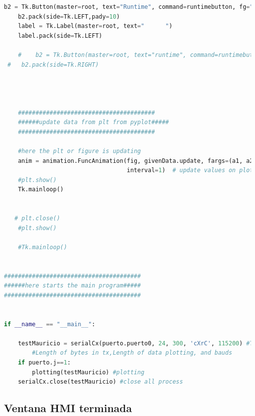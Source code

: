 {\begin{lstlisting}[language=python]
    b2 = Tk.Button(master=root, text="Runtime", command=runtimebutton, fg="blue")
    b2.pack(side=Tk.LEFT,pady=10)
    label = Tk.Label(master=root, text="      ")
    label.pack(side=Tk.LEFT)

    #    b2 = Tk.Button(master=root, text="runtime", command=runtimebutton)
 #   b2.pack(side=Tk.RIGHT)




    #######################################
    ######update data from plt from pyplot#####
    #######################################

    #here the plt or figure is updating
    anim = animation.FuncAnimation(fig, givenData.update, fargs=(a1, a2, a3, a4, rtime), frames=1000,
                                   interval=1)  # update values on plot #200 frames each 1 ms
    #plt.show()
    Tk.mainloop()


   # plt.close()
    #plt.show()

    #Tk.mainloop()


#######################################
######here starts the main program#####
#######################################


if __name__ == "__main__":

    testMauricio = serialCx(puerto.puerto0, 24, 300, 'cXrC', 115200) #This values modifie serialport, 
		#Length of bytes in tx,Length of data plotting, and bauds
    if puerto.j==1:
        plotting(testMauricio) #plotting
    serialCx.close(testMauricio) #close all process


\end{lstlisting}

}


\subsection{Ventana HMI terminada}

